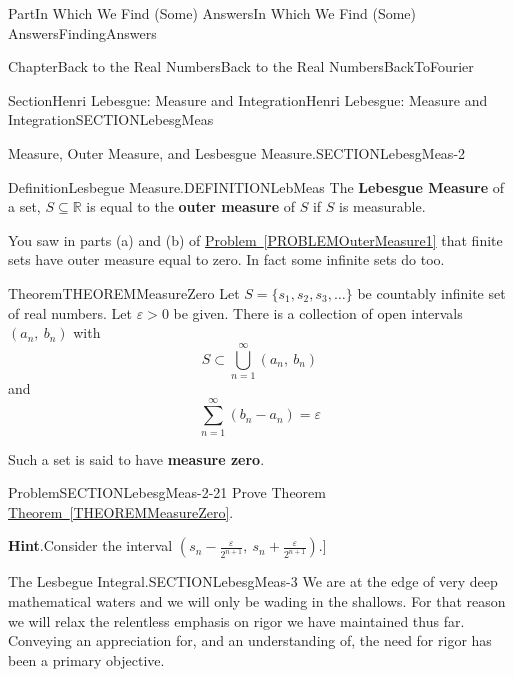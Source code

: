 \documentclass[oneside,10pt,]{book}
\newcommand{\blocktitlefont}{\relax}
\newcommand{\xreffont}{\relax}
\newcommand{\terminology}[1]{\textbf{#1}}
\numberwithin{equation}{part}
\newcommand{\eps}{\varepsilon}
\newcommand{\RR}{\mathbb {R}}
\newcommand{\gt}{>}
\begin{document}
\begin{partptx}{Part}{In Which We Find (Some) Answers}{}{In Which We Find (Some) Answers}{}{}{FindingAnswers}
\begin{chapterptx}{Chapter}{Back to the Real Numbers}{}{Back to the Real Numbers}{}{}{BackToFourier}
\begin{sectionptx}{Section}{Henri Lebesgue: Measure and Integration}{}{Henri Lebesgue: Measure and Integration}{}{}{SECTIONLebesgMeas}
\begin{paragraphs}{Measure, Outer Measure, and  Lesbesgue Measure.}{SECTIONLebesgMeas-2}
\begin{definition}{Definition}{Lesbegue Measure.}{DEFINITIONLebMeas}%
The \terminology{Lebesgue Measure} of a set, \(S\subseteq
\RR{}\) is equal to the  \terminology{outer measure} of \(S\) if \(S\) is measurable.%
\end{definition}
You saw in parts (a) and (b) of \hyperref[PROBLEMOuterMeasure1]{Problem~{\xreffont\ref{PROBLEMOuterMeasure1}}} that finite sets have outer  measure equal to zero. In fact some infinite sets do too.%
\begin{theorem}{Theorem}{}{}{THEOREMMeasureZero}%
%
%
Let \(S=\{s_1, s_2, s_3, \dots \}\) be countably infinite set of real numbers.  Let \(\eps \gt 0\) be given.  There is a collection of open intervals \((a_n,\
b_n)\) with%
\begin{equation*}
S\subset \bigcup^{\infty
}_{n=1}{\left(a_n,\ b_n\right)}
\end{equation*}
and%
\begin{equation*}
\sum^{\infty
}_{n=1}{\left(b_n-a_n\right)}=\eps 
\end{equation*}
%
\par
Such a set is said to have \terminology{measure zero}.%
\end{theorem}
\begin{problem}{Problem}{}{SECTIONLebesgMeas-2-21}%
Prove Theorem \hyperref[THEOREMMeasureZero]{Theorem~{\xreffont\ref{THEOREMMeasureZero}}}.%
\par\smallskip%
\noindent\textbf{\blocktitlefont Hint}.\hypertarget{SECTIONLebesgMeas-2-21-2}{}\quad{}Consider the interval \(\left(s_n-\frac{\eps  }{2^{n+1}},\ s_n+\frac{\eps }{2^{n+1}}\right)\).]%
\end{problem}
\end{paragraphs}%
\begin{paragraphs}{The Lesbegue Integral.}{SECTIONLebesgMeas-3}%
We are at the edge of very deep mathematical waters and we will only be wading in the shallows. For that reason we will relax the relentless emphasis on rigor we have maintained thus far. Conveying an appreciation for, and an understanding of, the need for rigor has been a primary objective.%
\par

\end{paragraphs}
\end{sectionptx}
\end{chapterptx}
\end{partptx}
\end{document}
